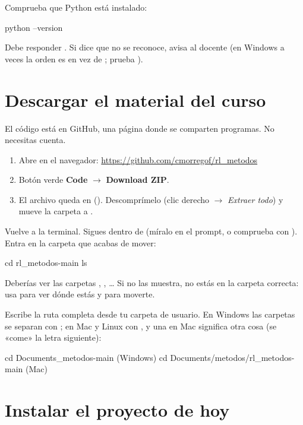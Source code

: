 Comprueba que Python está instalado:
\begin{orden}
python --version
\end{orden}
Debe responder . Si dice que no se reconoce, avisa al docente (en Windows a veces la orden es  en vez de ; prueba ).

\section{Descargar el material del curso}

El código está en GitHub, una página donde se comparten programas. No necesitas cuenta.
\begin{enumerate}
\item Abre en el navegador: \url{https://github.com/cmorregof/rl_metodos}
\item Botón verde \textbf{Code} $\to$ \textbf{Download ZIP}.
\item El archivo  queda en  (). Descomprímelo (clic derecho $\to$ \emph{Extraer todo}) y mueve la carpeta  a .
\end{enumerate}

Vuelve a la terminal. Sigues dentro de  (míralo en el prompt, o comprueba con ). Entra en la carpeta que acabas de mover:
\begin{orden}
cd rl_metodos-main
ls
\end{orden}
Deberías ver las carpetas , , … Si  no las muestra, no estás en la carpeta correcta: usa  para ver dónde estás y  para moverte.

\begin{nota}
Escribe la ruta completa desde tu carpeta de usuario. En Windows las carpetas se separan con \codigo{\textbackslash}; en Mac y Linux con \codigo{/}, y una \codigo{\textbackslash} en Mac significa otra cosa (se «come» la letra siguiente):
\begin{orden}
cd Documents\metodos\rl_metodos-main     (Windows)
cd Documents/metodos/rl_metodos-main     (Mac)
\end{orden}
\end{nota}

\section{Instalar el proyecto de hoy}

